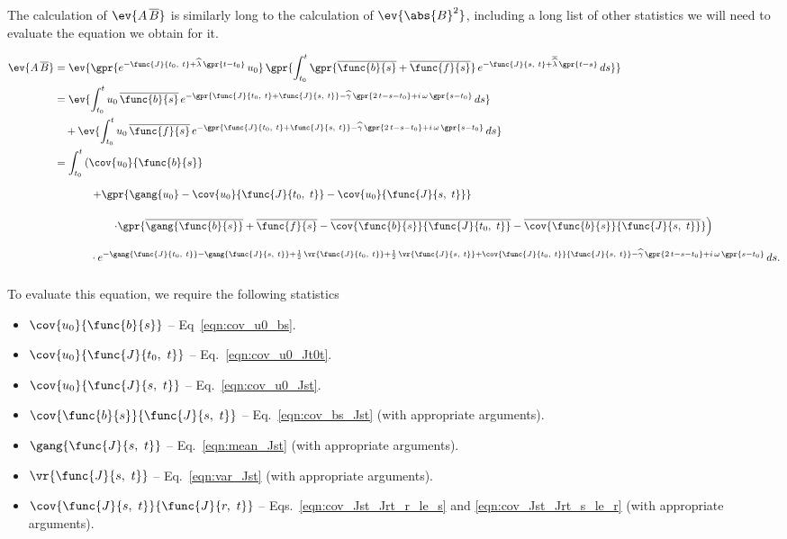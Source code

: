 The calculation of $\ev{A\,\overline{B}}$ is similarly long to the calculation of $\ev{\abs{B}^2}$, including a long list of other statistics we will need to evaluate the equation we obtain for it.

\begin{align}
    \ev{A\,\overline{B}} &= \ev{\gpr{e^{-\func{J}{t_0,\ t} + \widehat{\lambda}\,\gpr{t - t_0}}\,u_0}\,\gpr{\int_{t_0}^{t} \gpr{\overline{\func{b}{s}} + \overline{\func{f}{s}}}\,e^{-\func{J}{s,\ t} + \overline{\widehat{\lambda}}\,\gpr{t - s}}\,ds}} \nonumber \\
    	&= \ev{\int_{t_0}^{t} u_0\,\overline{\func{b}{s}}\,e^{-\gpr{\func{J}{t_0,\ t} + \func{J}{s,\ t}} - \widehat{\gamma}\,\gpr{2\,t - s - t_0} + i\,\omega\,\gpr{s - t_0}}\,ds} \nonumber \\
    		&\quad + \ev{\int_{t_0}^{t} u_0\,\overline{\func{f}{s}}\,e^{-\gpr{\func{J}{t_0,\ t} + \func{J}{s,\ t}} - \widehat{\gamma}\,\gpr{2\,t - s - t_0} + i\,\omega\,\gpr{s - t_0}}\,ds} \nonumber \\
    	&= \int_{t_0}^{t} \left( \cov{u_0}{\func{b}{s}} \right. \nonumber \\
    		&\phantom{\int_{t_0}^{t}}\qquad \left. + \gpr{\gang{u_0} - \cov{u_0}{\func{J}{t_0,\ t}} - \cov{u_0}{\func{J}{s,\ t}}} \right. \nonumber \\
    		&\phantom{\int_{t_0}^{t}}\qquad\qquad \left. \cdot \gpr{\overline{\gang{\func{b}{s}}} + \overline{\func{f}{s}} - \overline{\cov{\func{b}{s}}{\func{J}{t_0,\ t}}} - \overline{\cov{\func{b}{s}}{\func{J}{s,\ t}}}} \right) \nonumber \\
    		&\phantom{\int_{t_0}^{t}}\qquad \cdot e^{-\gang{\func{J}{t_0,\ t}} - \gang{\func{J}{s,\ t}} + \frac{1}{2}\,\vr{\func{J}{t_0,\ t}} + \frac{1}{2}\,\vr{\func{J}{s,\ t}} + \cov{\func{J}{t_0,\ t}}{\func{J}{s,\ t}} - \widehat{\gamma}\,\gpr{2\,t - s - t_0} + i\,\omega\,\gpr{s - t_0}}\,ds. \label{eqn:mean_AconjgB}
\end{align}

To evaluate this equation, we require the following statistics

\begin{itemize}
	\item [] $\cov{u_0}{\func{b}{s}}$ -- Eq~\ref{eqn:cov_u0_bs}.
	\item [] $\cov{u_0}{\func{J}{t_0,\ t}}$ -- Eq.~\ref{eqn:cov_u0_Jt0t}.
	\item [] $\cov{u_0}{\func{J}{s,\ t}}$ -- Eq.~\ref{eqn:cov_u0_Jst}.
	\item [] $\cov{\func{b}{s}}{\func{J}{s,\ t}}$ -- Eq.~\ref{eqn:cov_bs_Jst} (with appropriate arguments).
	\item [] $\gang{\func{J}{s,\ t}}$ -- Eq.~\ref{eqn:mean_Jst} (with appropriate arguments).
	\item [] $\vr{\func{J}{s,\ t}}$ -- Eq.~\ref{eqn:var_Jst} (with appropriate arguments).
	\item [] $\cov{\func{J}{s,\ t}}{\func{J}{r,\ t}}$ -- Eqs.~\ref{eqn:cov_Jst_Jrt_r_le_s} and \ref{eqn:cov_Jst_Jrt_s_le_r} (with appropriate arguments).
\end{itemize}
